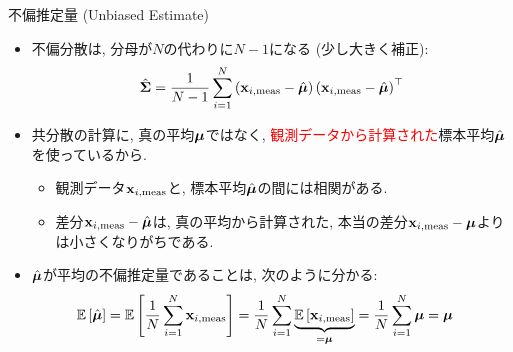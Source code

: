 \documentclass[dvipdfmx,notheorems,t]{beamer}
\begin{document}
\begin{frame}{不偏推定量 (Unbiased Estimate)}
\begin{itemize}
  \item 不偏分散は, 分母が$N$の代わりに$N - 1$になる (少し大きく補正):
  \begin{align*}
    \hat{\vb{\Sigma}} = \frac{1}{N - 1} \sum_{i = 1}^N
      \left( \vb{x}_{i, \mathrm{meas}} - \hat{\vb*{\mu}} \right)
      \left( \vb{x}_{i, \mathrm{meas}} - \hat{\vb*{\mu}} \right)^\top
  \end{align*}
  \item 共分散の計算に, 真の平均$\vb*{\mu}$ではなく,
  \textcolor{red}{観測データから計算された}標本平均$\hat{\vb*{\mu}}$を使っているから.
  \begin{itemize}
    \item 観測データ$\vb{x}_{i, \mathrm{meas}}$と, 標本平均$\hat{\vb*{\mu}}$の間には相関がある.
    \item 差分$\vb{x}_{i, \mathrm{meas}} - \hat{\vb*{\mu}}$は,
    真の平均から計算された, 本当の差分$\vb{x}_{i, \mathrm{meas}} - \vb*{\mu}$よりは小さくなりがちである.
  \end{itemize}
  \item $\hat{\vb*{\mu}}$が平均の不偏推定量であることは, 次のように分かる:
  \begin{align*}
    \operatorname{\mathbb{E}} \left[ \hat{\vb*{\mu}} \right] &= \operatorname{\mathbb{E}} \left[ \frac{1}{N} \sum_{i = 1}^N \vb{x}_{i, \mathrm{meas}} \right]
      = \frac{1}{N} \sum_{i = 1}^N \underbrace{\operatorname{\mathbb{E}} \left[ \vb{x}_{i, \mathrm{meas}} \right]}_{=\vb*{\mu}}
      = \frac{1}{N} \sum_{i = 1}^N \vb*{\mu} = \vb*{\mu}
  \end{align*}
\end{itemize}
\end{frame}
\end{document}
